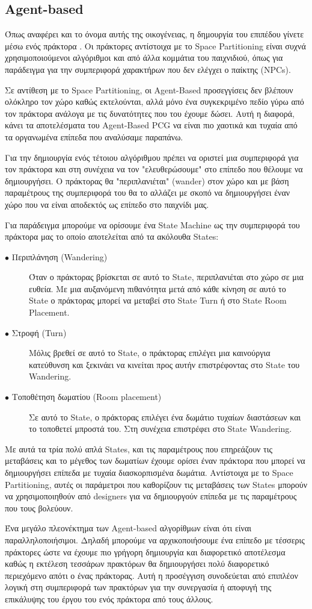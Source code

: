 \subsection{Agent-based}
Όπως αναφέρει και το όνομα αυτής της οικογένειας, η δημουργία του επιπέδου γίνετε μέσω ενός πράκτορα \cite{agents}. Οι πράκτορες αντίστοιχα με το Space Partitioning είναι συχνά χρησιμοποιούμενοι αλγόριθμοι και από άλλα κομμάτια του παιχνιδιού, όπως για παράδειγμα για την συμπεριφορά χαρακτήρων που δεν ελέγχει ο παίκτης (NPCs).
\par
Σε αντίθεση με το Space Partitioning, οι Agent-Based προσεγγίσεις δεν βλέπουν ολόκληρο τον χώρο καθώς εκτελούνται, αλλά μόνο ένα συγκεκριμένο πεδίο γύρω από τον πράκτορα ανάλογα με τις δυνατότητες που του έχουμε δώσει. Αυτή η διαφορά, κάνει τα αποτελέσματα του Agent-Based PCG να είναι πιο χαοτικά και τυχαία από τα οργανωμένα επίπεδα που αναλύσαμε παραπάνω.
\par
Για την δημιουργία ενός τέτοιου αλγόριθμου πρέπει να οριστεί μια συμπεριφορά για τον πράκτορα και στη συνέχεια να τον "ελευθερώσουμε" στο επίπεδο που θέλουμε να δημιουργήσει. Ο πράκτορας θα "περιπλανιέται" (wander) στον χώρο και με βάση παραμέτρους της συμπεριφορά του θα το αλλάζει με σκοπό να δημιουργήσει έναν χώρο που να είναι αποδεκτός ως επίπεδο στο παιχνίδι μας.
\par
Για παράδειγμα μπορούμε να ορίσουμε ένα State Machine ως την συμπεριφορά του πράκτορα μας το οποίο αποτελείται από τα ακόλουθα States:
\begin{description}
  \item[$\bullet$ Περιπλάνηση (Wandering)] Όταν ο πράκτορας βρίσκεται σε αυτό το State, περιπλανιέται στο χώρο σε μια ευθεία. Με μια αυξανόμενη πιθανότητα μετά από κάθε κίνηση σε αυτό το State ο πράκτορας μπορεί να μεταβεί στο State Turn ή στο State Room Placement.
  \item[$\bullet$ Στροφή (Turn)] Μόλις βρεθεί σε αυτό το State, ο πράκτορας επιλέγει μια καινούργια κατεύθυνση και ξεκινάει να κινείται προς αυτήν επιστρέφοντας στο State του Wandering. 
    \item[$\bullet$ Τοποθέτηση δωματίου (Room placement)] Σε αυτό το State, ο πράκτορας επιλέγει ένα δωμάτιο τυχαίων διαστάσεων και το τοποθετεί μπροστά του. Στη συνέχεια επιστρέφει στο State Wandering.
\end{description}
Με αυτά τα τρία πολύ απλά States, και τις παραμέτρους που επηρεάζουν τις μεταβάσεις και το μέγεθος των δωματίων έχουμε ορίσει έναν πράκτορα που μπορεί να δημιουργήσει επίπεδα με τυχαία διασκορπισμένα δωμάτια. Αντίστοιχα με το Space Partitioning, αυτές οι παράμετροι που καθορίζουν τις μεταβάσεις των States μπορούν να χρησιμοποιηθούν από designers για να δημιουργούν επίπεδα με τις παραμέτρους που τους βολεύουν.
\par
Ένα μεγάλο πλεονέκτημα των Agent-based αλγορίθμων είναι ότι είναι παραλληλοποιήσιμοι. Δηλαδή μπορούμε να αρχικοποιήσουμε ένα επίπεδο με τέσσερις πράκτορες ώστε να έχουμε πιο γρήγορη δημιουργία και διαφορετικό αποτέλεσμα καθώς η εκτέλεση τεσσάρων πρακτόρων θα δημιουργήσει πολύ διαφορετικό περιεχόμενο απότι ο ένας πράκτορας. Αυτή η προσέγγιση συνοδεύεται από επιπλέον λογική στη συμπεριφορά των πρακτόρων για την συνεργασία ή αποφυγή της επικάλυψης του έργου του ενός πράκτορα από τους άλλους.

